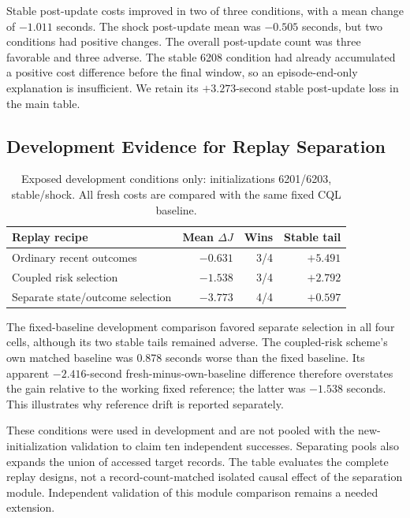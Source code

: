 \documentclass[journal]{IEEEtran}
\begin{document}
Stable post-update costs improved in two of three conditions, with a mean change of $-1.011$ seconds. The shock post-update mean was $-0.505$ seconds, but two conditions had positive changes. The overall post-update count was three favorable and three adverse. The stable 6208 condition had already accumulated a positive cost difference before the final window, so an episode-end-only explanation is insufficient. We retain its $+3.273$-second stable post-update loss in the main table.

\subsection{Development Evidence for Replay Separation}
\begin{table}[t]
\centering\caption{Exposed development conditions only: initializations 6201/6203, stable/shock. All fresh costs are compared with the same fixed CQL baseline.}
\label{tab:development}
\begin{tabular}{p{}rrr}\toprule
Replay recipe & Mean $\Delta J$ & Wins & Stable tail\\\midrule
Ordinary recent outcomes & $-0.631$ & 3/4 & $+5.491$\\
Coupled risk selection & $-1.538$ & 3/4 & $+2.792$\\
Separate state/outcome selection & $-3.773$ & 4/4 & $+0.597$\\\bottomrule
\end{tabular}
\end{table}

The fixed-baseline development comparison favored separate selection in all four cells, although its two stable tails remained adverse. The coupled-risk scheme's own matched baseline was 0.878 seconds worse than the fixed baseline. Its apparent $-2.416$-second fresh-minus-own-baseline difference therefore overstates the gain relative to the working fixed reference; the latter was $-1.538$ seconds. This illustrates why reference drift is reported separately.

These conditions were used in development and are not pooled with the new-initialization validation to claim ten independent successes. Separating pools also expands the union of accessed target records. The table evaluates the complete replay designs, not a record-count-matched isolated causal effect of the separation module. Independent validation of this module comparison remains a needed extension.
\end{document}
